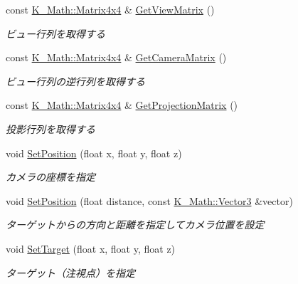 \begin{DoxyCompactItemize}
const \mbox{\hyperlink{namespace_k___math_a345271af9d32dff2c964bc679b13b45c}{K\+\_\+\+Math\+::\+Matrix4x4}} \& \mbox{\hyperlink{class_k___graphics_1_1_camera_class_a25c8ec2869536e3ba080d5c34749defc}{Get\+View\+Matrix}} ()
\begin{DoxyCompactList}\small\item\em ビュー行列を取得する \end{DoxyCompactList}\item 
const \mbox{\hyperlink{namespace_k___math_a345271af9d32dff2c964bc679b13b45c}{K\+\_\+\+Math\+::\+Matrix4x4}} \& \mbox{\hyperlink{class_k___graphics_1_1_camera_class_a8e972464a146b6f87198debd8571d4e9}{Get\+Camera\+Matrix}} ()
\begin{DoxyCompactList}\small\item\em ビュー行列の逆行列を取得する \end{DoxyCompactList}\item 
const \mbox{\hyperlink{namespace_k___math_a345271af9d32dff2c964bc679b13b45c}{K\+\_\+\+Math\+::\+Matrix4x4}} \& \mbox{\hyperlink{class_k___graphics_1_1_camera_class_a660c15df166e940e7dac70f2dfed98e1}{Get\+Projection\+Matrix}} ()
\begin{DoxyCompactList}\small\item\em 投影行列を取得する \end{DoxyCompactList}\item 
void \mbox{\hyperlink{class_k___graphics_1_1_camera_class_af8264e04ed973e00f3c331d6988f15c1}{Set\+Position}} (float x, float y, float z)
\begin{DoxyCompactList}\small\item\em カメラの座標を指定 \end{DoxyCompactList}\item 
void \mbox{\hyperlink{class_k___graphics_1_1_camera_class_a06189cd5e4c554e46724204053e69a2d}{Set\+Position}} (float distance, const \mbox{\hyperlink{namespace_k___math_a66884d78082c39ada4091c211f3570f8}{K\+\_\+\+Math\+::\+Vector3}} \&vector)
\begin{DoxyCompactList}\small\item\em ターゲットからの方向と距離を指定してカメラ位置を設定 \end{DoxyCompactList}\item 
void \mbox{\hyperlink{class_k___graphics_1_1_camera_class_af40a20fb1f670a489544774c30272188}{Set\+Target}} (float x, float y, float z)
\begin{DoxyCompactList}\small\item\em ターゲット（注視点）を指定 \end{DoxyCompactList}\item 

\end{DoxyCompactItemize}
